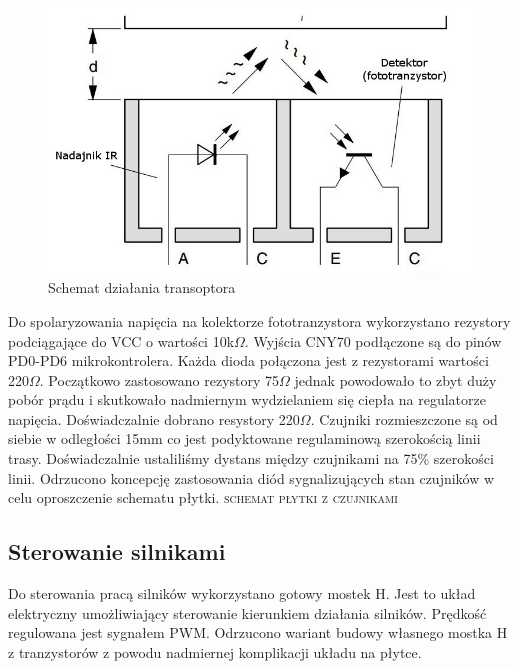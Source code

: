 \documentclass[11pt,a4paper]{article}
\begin{document}
\begin{figure}[H]
  \includegraphics[scale=0.6]{CNY70}
  \caption{Schemat działania transoptora}
\end{figure}

Do spolaryzowania napięcia na kolektorze fototranzystora wykorzystano rezystory podciągające do VCC o wartości 10k$\Omega$. 
Wyjścia CNY70 podłączone są do pinów PD0-PD6 mikrokontrolera.
Każda dioda połączona jest z rezystorami wartości 220$\Omega$. Początkowo zastosowano rezystory 75$\Omega$ jednak powodowało to zbyt duży pobór prądu i skutkowało nadmiernym wydzielaniem się ciepła na regulatorze napięcia. Doświadczalnie dobrano resystory 220$\Omega$.
Czujniki rozmieszczone są od siebie w odległości 15mm co jest podyktowane regulaminową szerokością linii trasy. Doświadczalnie ustaliliśmy dystans między czujnikami na 75\% szerokości linii.
Odrzucono koncepcję zastosowania diód sygnalizujących stan czujników w celu oproszczenie schematu płytki.
\textsc{schemat płytki z czujnikami}

\subsection{Sterowanie silnikami} 
Do sterowania pracą silników wykorzystano gotowy mostek H. Jest to układ elektryczny umożliwiający sterowanie kierunkiem działania silników. 
Prędkość regulowana jest sygnałem PWM. Odrzucono wariant budowy własnego mostka H z tranzystorów z powodu nadmiernej komplikacji układu na płytce.
\end{document}
